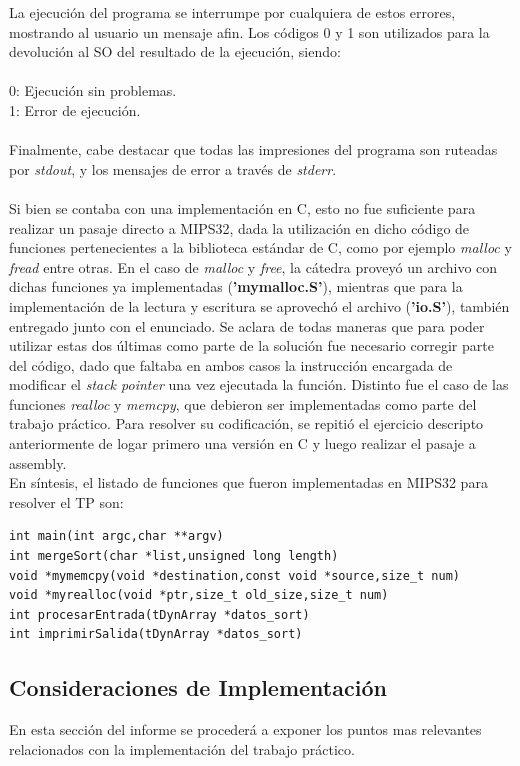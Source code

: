 \documentclass[a4paper,10pt]{article}
\begin{document}
La ejecuci\'on del programa se interrumpe por cualquiera de estos errores, mostrando al usuario un mensaje afin. Los c\'odigos 0 y 1 son utilizados para la devoluci\'on al SO del resultado de la ejecuci\'on, siendo:\\
\\
0: Ejecuci\'on sin problemas.\\
1: Error de ejecuci\'on.\\
\\
Finalmente, cabe destacar que todas las impresiones del programa son ruteadas por \textit{stdout}, y los mensajes de error a trav\'es de \textit{stderr}.\\
\\Si bien se contaba con una implementaci\'on en C, esto no fue suficiente para realizar un pasaje directo a MIPS32, dada la utilizaci\'on en dicho c\'odigo de funciones pertenecientes a la biblioteca est\'andar de C, como por ejemplo \textit{malloc} y \textit{fread} entre otras. En el caso de \textit{malloc} y \textit{free}, la c\'atedra provey\'o un archivo con dichas funciones ya implementadas (\textbf{'mymalloc.S'}), mientras que para la implementaci\'on de la lectura y escritura se aprovech\'o el archivo (\textbf{'io.S'}), tambi\'en entregado junto con el enunciado. Se aclara de todas maneras que para poder utilizar estas dos \'ultimas como parte de la soluci\'on fue necesario corregir parte del c\'odigo, dado que faltaba en ambos casos la instrucci\'on encargada de modificar el \textit{stack pointer} una vez ejecutada la funci\'on.  Distinto fue el caso de las funciones \textit{realloc} y \textit{memcpy}, que debieron ser implementadas como parte del trabajo pr\'actico. Para resolver su codificaci\'on, se repiti\'o el ejercicio descripto anteriormente de logar primero una versi\'on en C y luego realizar el pasaje a assembly.\\
En s\'intesis, el listado de funciones que fueron implementadas en MIPS32 para resolver el TP son:
{\footnotesize \begin{verbatim}
int main(int argc,char **argv)
int mergeSort(char *list,unsigned long length)
void *mymemcpy(void *destination,const void *source,size_t num)
void *myrealloc(void *ptr,size_t old_size,size_t num)
int procesarEntrada(tDynArray *datos_sort)
int imprimirSalida(tDynArray *datos_sort)
\end{verbatim}}

\subsection{Consideraciones de Implementaci\'on}
En esta secci\'on del informe se proceder\'a a exponer los puntos mas relevantes relacionados con la implementaci\'on del trabajo pr\'actico.
\end{document}
